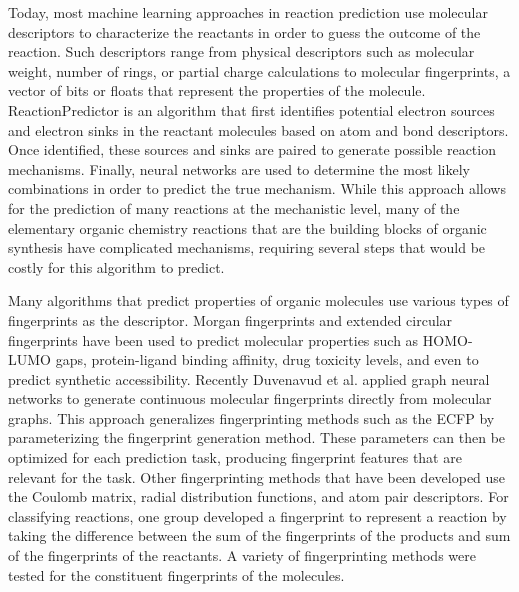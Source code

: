 Today, most machine learning approaches in reaction prediction use molecular descriptors to characterize the reactants in order to guess the outcome of the reaction. Such descriptors range from physical descriptors such as molecular weight, number of rings, or partial charge calculations to molecular fingerprints, a vector of bits or floats that represent the properties of the molecule. ReactionPredictor\cite{Kayala_2012, Kayala2011Learning} is an algorithm that first identifies potential electron sources and electron sinks in the reactant molecules based on atom and bond descriptors. Once identified, these sources and sinks are paired to generate possible reaction mechanisms. Finally, neural networks are used to determine the most likely combinations in order to predict the true mechanism. While this approach allows for the prediction of many reactions at the mechanistic level, many of the elementary organic chemistry reactions that are the building blocks of organic synthesis have complicated mechanisms, requiring several steps that would be costly for this algorithm to predict.

Many algorithms that predict properties of organic molecules use various types of fingerprints as the descriptor. Morgan fingerprints and extended circular fingerprints \cite{morgan1965generation,Rogers2010Extended} have been used to predict molecular properties such as HOMO-LUMO gaps\cite{Pyzer_Knapp_2015a}, protein-ligand binding affinity\cite{Ballester_2010}, drug toxicity levels\cite{Zhang_2006}, and even to predict synthetic accessibility\cite{Podolyan_2010}. Recently Duvenavud et al. applied graph neural networks\cite{duvenaud2015convolutional} to generate continuous molecular fingerprints directly from molecular graphs. This approach generalizes fingerprinting methods such as the ECFP by parameterizing the fingerprint generation method. These parameters can then be optimized for each prediction task, producing fingerprint features that are relevant for the task. Other fingerprinting methods that have been developed use the Coulomb matrix\cite{montavon2012learning}, radial distribution functions\cite{von2015fourier}, and atom pair descriptors\cite{Carhart_1985}. For classifying reactions, one group developed a fingerprint to represent a reaction by taking the difference between the sum of the fingerprints of the products and sum of the fingerprints of the reactants\cite{Schneider_2015}. A variety of fingerprinting methods were tested for the constituent fingerprints of the molecules.

